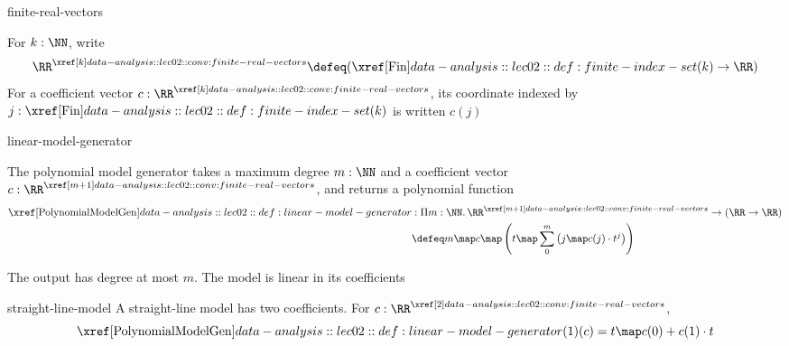 \documentclass[12pt]{article}
\numberwithin{figure}{section}
\begin{document}
\begin{conv}{finite-real-vectors}
  \leavevmode\par
  \begingroup\color{notesmissingprereq}
  \par\smallskip
    For $k:\NN$, write
    \[
      \RealVectors{k}\defeq(\Fin(k)\to\RR)
    \]
    For a coefficient vector $c:\RealVectors{k}$, its coordinate
    indexed by $j:\Fin(k)$ is written $c(j)$
    \par\smallskip{}
  \par\endgroup
\end{conv}

\begin{dfn}{linear-model-generator}
  \leavevmode\par
  \begingroup\color{notesmissingprereq}
  \par\smallskip
    The polynomial model generator takes a maximum degree $m:\NN$
    and a coefficient vector $c:\RealVectors{m+1}$, and returns a
    polynomial function
    \[
    \begin{aligned}
      \PolynomialModelGen &: \Pi m:\NN.\,\RealVectors{m+1}\to(\RR\to\RR) \\
      &\defeq m\map c\map\left(t\map
        \sum_0^m\left(j\map c(j)\cdot t^j\right)\right)
    \end{aligned}
    \]
    \par\smallskip{}
  \par\endgroup
\end{dfn}

\begin{rem}
    The output has degree at most $m$.
    The model is linear in its coefficients
\end{rem}

\begin{eg}{straight-line-model}
    A straight-line model has two coefficients. For $c:\RealVectors{2}$,
    \[
      \PolynomialModelGen(1)(c)=t\map c(0)+c(1)\cdot t
    \]
\end{eg}
\end{document}
